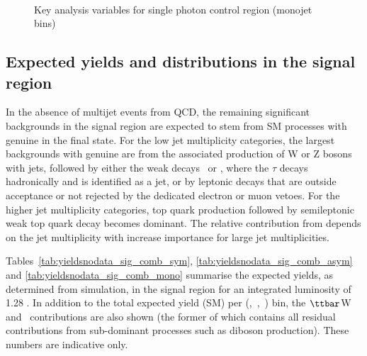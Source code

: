 \begin{figure}
\begin{center}
         \\
        \caption{Key analysis variables for single photon control region (monojet bins)}
        \label{fig:distribution_singlephoton_mono}
    \end{center}
\end{figure}

\clearpage
\subsection{Expected yields and distributions in the signal region}

In the absence of multijet events from QCD, the remaining significant
backgrounds in the signal region are expected to stem from SM
processes with genuine \met in the final state. For the low jet
multiplicity categories, the largest backgrounds with genuine \met are
from the associated production of W or Z bosons with jets, followed by
either the weak decays \znunu\ or \wtaunu, where the $\tau$ decays
hadronically and is identified as a jet, or by leptonic decays that
are outside acceptance or not rejected by the dedicated electron or
muon vetoes. For the higher jet multiplicity categories, top quark
production followed by semileptonic weak top quark decay becomes
dominant. The relative contribution from \ttbar depends on the jet
multiplicity with increase importance for large jet multiplicities.

Tables~\ref{tab:yieldsnodata_sig_comb_sym},
\ref{tab:yieldsnodata_sig_comb_asym} and \ref{tab:yieldsnodata_sig_comb_mono} 
summarise the expected yields, as
determined from simulation, in the signal region for an integrated
luminosity of 1.28 \ifb. In addition to the total expected yield (SM)
per (\njet,~\nb,~\scalht) bin, the $\ttbar$W and \znunu\ contributions
are also shown (the former of which contains all residual
contributions from sub-dominant processes such as \eg diboson
production). These numbers are indicative only.

